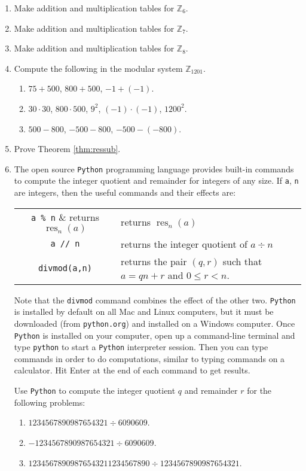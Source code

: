\documentclass[11pt]{article}
\newenvironment{problems}
{
 \begin{enumerate}[topsep=1pt,itemsep=0pt,parsep=2pt,leftmargin=0.6cm,%
 label={\arabic*.}, ref=\arabic*] \small
}
{
 \end{enumerate}
}
\theoremstyle{definition}
\newcommand{\Z}{\mathbb{Z}} %
\newcommand{\res}{\operatorname{res}}
\begin{document}
\begin{problems}
\item Make addition and multiplication tables for $\Z_6$.

\item Make addition and multiplication tables for $\Z_7$.

\item Make addition and multiplication tables for $\Z_8$.

\item Compute the following in the modular system $\Z_{1201}$.
  \begin{enumerate}
  \item $75+500$, $800+500$, $-1 + (-1)$.
  \item $30 \cdot 30$, $800 \cdot 500$, $9^2$, $(-1)
    \cdot (-1)$, $1200^2$.
  \item $500-800$, $-500-800$, $-500-(-800)$.
  \end{enumerate}

\item Prove Theorem \ref{thm:ressub}.

\item \label{exer:python} The open source \texttt{Python} programming
  language provides built-in commands to compute the integer quotient
  and remainder for integers of any size. If \texttt{a}, \texttt{n}
  are integers, then the useful commands and their effects are:
  \begin{center}
  \begin{tabular}{cl}
    \verb$a % n$ & returns $\res_n(a)$\\
    \texttt{a // n} &  returns the integer quotient of $a \div n$\\
    \texttt{divmod(a,n)} & returns the pair $(q,r)$ such that $a
      = qn+r$ and $0 \le r < n$.
  \end{tabular}
  \end{center}
  Note that the \texttt{divmod} command combines the effect of the
  other two. \texttt{Python} is installed by default on all Mac and
  Linux computers, but it must be downloaded (from \texttt{python.org})
  and installed on a Windows computer. Once \texttt{Python} is
  installed on your computer, open up a command-line terminal and type
  \texttt{python} to start a \texttt{Python} interpreter session. Then
  you can type commands in order to do computations, similar to typing
  commands on a calculator. Hit Enter at the end of each command to
  get results.

  Use \texttt{Python} to compute the integer quotient $q$ and
  remainder $r$ for the following problems:
  \begin{enumerate}
  \item $1234567890987654321 \div 6090609$.
  \item $-1234567890987654321 \div 6090609$.
  \item $12345678909876543211234567890 \div 1234567890987654321$.
  \end{enumerate}




\end{problems}
\end{document}
